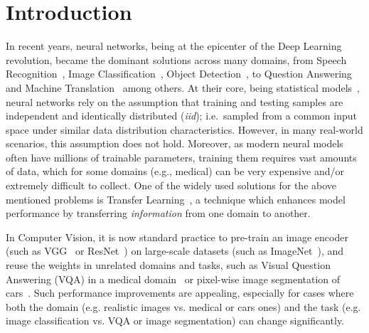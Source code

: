 \section{Introduction}
In recent years, neural networks, being at the epicenter of the Deep Learning~\cite{lecun2015deep} revolution, became the dominant solutions across many domains, from Speech Recognition~\cite{graves2013speech}, Image Classification~\cite{krizhevsky2012imagenet}, Object Detection~\cite{redmon2016you}, to Question Answering~\cite{weston2014memory} and Machine Translation~\cite{bahdanau2014neural} among others.
At their core, being statistical models~\cite{ripley1993statistical,warner1996understanding}, neural networks rely on the assumption that training and testing samples are independent and identically distributed (\textit{iid}); i.e.\ sampled from a common input space under similar data distribution characteristics.
However, in many real-world scenarios, this assumption does not hold. Moreover, as modern neural models often have millions of trainable parameters, training them requires vast amounts of data, which for some domains (e.g., medical) can be very expensive and/or extremely difficult to collect.
One of the widely used solutions for the above mentioned problems is Transfer Learning~\cite{pan2009survey,weiss2016survey}, a technique which enhances model performance by transferring \emph{information} from one domain to another.


In Computer Vision, it is now standard practice to pre-train an image encoder (such as VGG~\cite{simonyan2014very} or ResNet~\cite{he2016deep}) on large-scale datasets (such as ImageNet~\cite{deng2009imagenet}), and reuse the weights in unrelated domains and tasks, such as Visual Question Answering (VQA) in a medical domain~\cite{kornuta2019leveraging} or pixel-wise image segmentation of cars~\cite{iglovikov2018ternausnet}.
Such performance improvements are appealing, especially for cases where both the domain (e.g. realistic images vs. medical or cars ones) and the task (e.g. image classification vs. VQA or image segmentation) can change significantly. %

